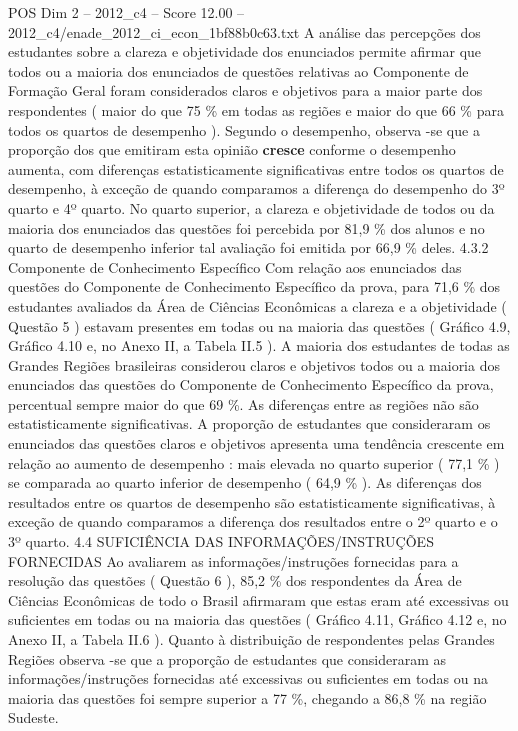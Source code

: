 \begin{textsample}{POS Dim 2 – 2012\_c4 – Score 12.00 – 2012\_c4/enade\_2012\_ci\_econ\_1bf88b0c63.txt}
A análise das percepções dos estudantes sobre a clareza e objetividade dos enunciados permite afirmar que todos ou a maioria dos enunciados de questões relativas ao Componente de Formação Geral foram considerados claros e objetivos para a maior parte dos respondentes ( maior do que 75 \% em todas as regiões e maior do que 66 \% para todos os quartos de desempenho ).
Segundo o desempenho, observa -se que a proporção dos que emitiram esta opinião \textbf{cresce} conforme o desempenho aumenta, com diferenças estatisticamente significativas entre todos os quartos de desempenho, à exceção de quando comparamos a diferença do desempenho do 3º quarto e 4º quarto.
No quarto superior, a clareza e objetividade de todos ou da maioria dos enunciados das questões foi percebida por 81,9 \% dos alunos e no quarto de desempenho inferior tal avaliação foi emitida por 66,9 \% deles. 4.3.2 Componente de Conhecimento Específico Com relação aos enunciados das questões do Componente de Conhecimento Específico da prova, para 71,6 \% dos estudantes avaliados da Área de Ciências Econômicas a clareza e a objetividade ( Questão 5 ) estavam presentes em todas ou na maioria das questões ( Gráfico 4.9, Gráfico 4.10 e, no Anexo II, a Tabela II.5 ).
A maioria dos estudantes de todas as Grandes Regiões brasileiras considerou claros e objetivos todos ou a maioria dos enunciados das questões do Componente de Conhecimento Específico da prova, percentual sempre maior do que 69 \%.
As diferenças entre as regiões não são estatisticamente significativas.
A proporção de estudantes que consideraram os enunciados das questões claros e objetivos apresenta uma tendência crescente em relação ao aumento de desempenho : mais elevada no quarto superior ( 77,1 \% ) se comparada ao quarto inferior de desempenho ( 64,9 \% ).
As diferenças dos resultados entre os quartos de desempenho são estatisticamente significativas, à exceção de quando comparamos a diferença dos resultados entre o 2º quarto e o 3º quarto. 4.4 SUFICIÊNCIA DAS INFORMAÇÕES/INSTRUÇÕES FORNECIDAS Ao avaliarem as informações/instruções fornecidas para a resolução das questões ( Questão 6 ), 85,2 \% dos respondentes da Área de Ciências Econômicas de todo o Brasil afirmaram que estas eram até excessivas ou suficientes em todas ou na maioria das questões ( Gráfico 4.11, Gráfico 4.12 e, no Anexo II, a Tabela II.6 ).
Quanto à distribuição de respondentes pelas Grandes Regiões observa -se que a proporção de estudantes que consideraram as informações/instruções fornecidas até excessivas ou suficientes em todas ou na maioria das questões foi sempre superior a 77 \%, chegando a 86,8 \% na região Sudeste.

\end{textsample}
